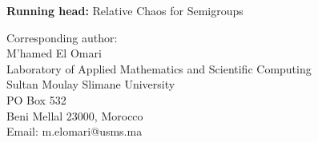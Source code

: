 \documentclass[12pt]{article}
\begin{document}
\newpage
\thispagestyle{empty}

\noindent \textbf{Running head:} Relative Chaos for Semigroups

\vspace{1cm}

\noindent Corresponding author:\\
M'hamed El Omari\\
Laboratory of Applied Mathematics and Scientific Computing\\
Sultan Moulay Slimane University\\
PO Box 532\\
Beni Mellal 23000, Morocco\\
Email: m.elomari@usms.ma
\end{document}
